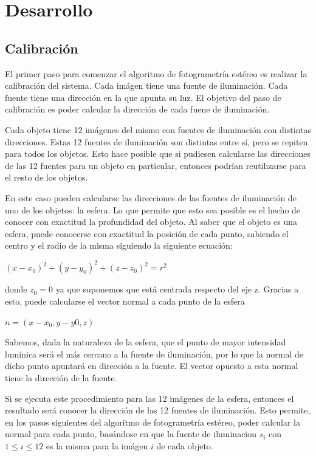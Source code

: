 \section{Desarrollo}

\subsection{Calibración}

El primer paso para comenzar el algoritmo de fotogrametría estéreo es realizar
la calibración del sistema. Cada imágen tiene una fuente de iluminación. Cada
fuente tiene una dirección en la que apunta su luz. El objetivo del paso de
calibración es poder calcular la dirección de cada fuene de iluminación.

Cada objeto tiene 12 imágenes del mismo con fuentes de iluminación con
distintas direcciones. Estas 12 fuentes de iluminación son distintas entre sí,
pero se repiten para todos los objetos. Esto hace posible que si pudiesen
calcularse las direcciones de las 12 fuentes para un objeto en particular,
entonces podrían reutilizarse para el resto de los objetos.

En este caso pueden calcularse las direcciones de las fuentes de iluminación
de uno de los objetos: la esfera. Lo que permite que esto sea posible es el
hecho de conocer con exactitud la profundidad del objeto. Al saber que el
objeto es una esfera, puede conocerse con exactitud la posición de cada
punto, sabiendo el centro y el radio de la misma siguiendo la siguiente
ecuación:

\begin{center}
$(x - x_0)^2 + (y - y_0)^2 + (z - z_0)^2 = r^2$
\end{center}

donde $z_0 = 0$ ya que suponemos que está centrada respecto del eje z.
Gracias a esto, puede calcularse el vector normal a cada punto de la esfera

\begin{center}
$n = (x - x_0, y - y0, z)$
\end{center}

Sabemos, dada la naturaleza de la esfera, que el punto de mayor intensidad
lumínica será el más cercano a la fuente de iluminación, por lo que la normal
de dicho punto apuntará en dirección a la fuente. El vector opuesto a esta
normal tiene la dirección de la fuente.

Si se ejecuta este procedimiento para las 12 imágenes de la esfera, entonces
el resultado será conocer la dirección de las 12 fuentes de iluminación. Esto
permite, en los pasos siguientes del algoritmo de fotogrametría estéreo,
poder calcular la normal para cada punto, basándose en que la fuente de
iluminacion $s_i$ con $1 \leq i \leq 12$ es la misma para la imágen $i$ de
cada objeto.

